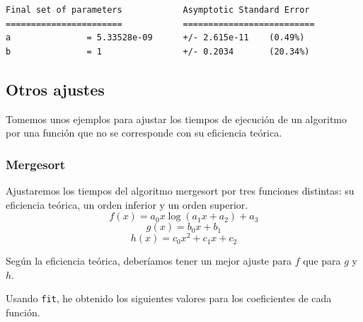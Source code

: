 \documentclass[a4]{article}
\begin{document}
\begin{verbatim}
Final set of parameters            Asymptotic Standard Error
=======================            ==========================
a               = 5.33528e-09      +/- 2.615e-11    (0.49%)
b               = 1                +/- 0.2034       (20.34%)
\end{verbatim}

\vspace{-2mm}

\begin{figure}[H] \centering {}
\end{figure}

\subsection{Otros ajustes}

\begin{flushleft}
  Tomemos unos ejemplos para ajustar los tiempos de ejecución de un
  algoritmo por una función que no se corresponde con su eficiencia
  teórica.
\end{flushleft}

\subsubsection{Mergesort}

\begin{flushleft} 
  Ajustaremos los tiempos del algoritmo mergesort por tres funciones
  distintas: su eficiencia teórica, un orden inferior y un orden
  superior.
\[f(x)=a_0x\log(a_1x+a_2)+a_3\]
\[g(x)=b_0x+b_1\]
\[h(x)=c_0x^2+c_1x+c_2\]

Según la eficiencia teórica, deberíamos tener un mejor ajuste para $f$
que para $g$ y $h$.
\end{flushleft}

\begin{flushleft}
  Usando \texttt{fit}, he obtenido los siguientes valores para los
  coeficientes de cada función.
\end{flushleft}
\end{document}
